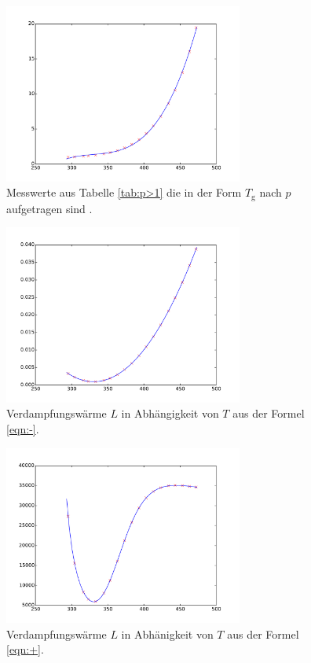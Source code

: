 \begin{figure}
  \centering
  \includegraphics[width=0.7\textwidth]{plot2.pdf}
  \caption{Messwerte aus Tabelle \ref{tab:p>1} die in der Form $T_\mathrm{g}$ nach $p$ aufgetragen sind .}
  \label{abb:plot2}
\end{figure}





\begin{figure}
  \centering
  \includegraphics[width=0.7\textwidth]{plot3.pdf}
  \caption{Verdampfungswärme $L$ in Abhängigkeit von $T$ aus der Formel \eqref{eqn:-}.}
  \label{abb:graph-}
\end{figure}

\begin{figure}
  \centering
  \includegraphics[width=0.7\textwidth]{plot4.pdf}
  \caption{Verdampfungswärme $L$ in Abhänigkeit von $T$ aus der Formel \eqref{eqn:+}.}
  \label{abb:graph+}
\end{figure}
